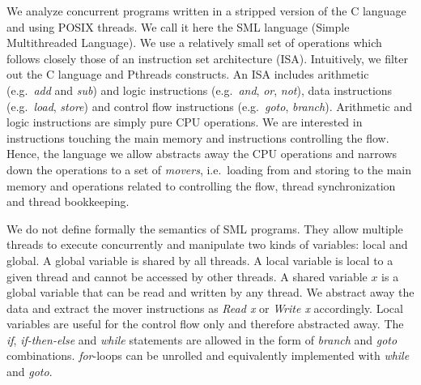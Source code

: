 \label{section:language}

We analyze concurrent programs written in a stripped version of the C
language and using POSIX threads.
%
We call it here the SML language (Simple Multithreaded Language).
%
We use a relatively small set of operations which follows closely
those of an instruction set architecture (ISA). Intuitively, we filter
out the C language and Pthreads constructs. An ISA includes arithmetic
(e.g.\ \emph{add} and \emph{sub}) and logic instructions (e.g.\
\emph{and}, \emph{or}, \emph{not}), data instructions (e.g.\
\emph{load}, \emph{store}) and control flow instructions (e.g.\
\emph{goto}, \emph{branch}).
%
Arithmetic and logic instructions are simply pure CPU operations. We
are interested in instructions touching the main memory and
instructions controlling the flow. Hence, the language we allow
abstracts away the CPU operations and narrows down the operations to a
set of \emph{movers}, i.e.\ loading from and storing to the main
memory and operations related to controlling the flow, thread
synchronization and thread bookkeeping.


We do not define formally the semantics of SML programs. They allow
multiple threads to execute concurrently and manipulate two kinds of
variables: local and global. A global variable is
shared %
by all threads. A local variable is local to a given thread and cannot
be accessed by other threads.
%
A shared variable $x$ is a global variable that can be read and
written by any thread. We abstract away the data and extract the mover
instructions as \emph{Read x} or \emph{Write x} accordingly. Local
variables are useful for the control flow only and therefore
abstracted away.
The \emph{if}, \emph{if-then-else} and \emph{while} statements are
allowed in the form of \emph{branch} and \emph{goto}
combinations. \emph{for}-loops can be unrolled and equivalently
implemented with \emph{while} and \emph{goto}.

